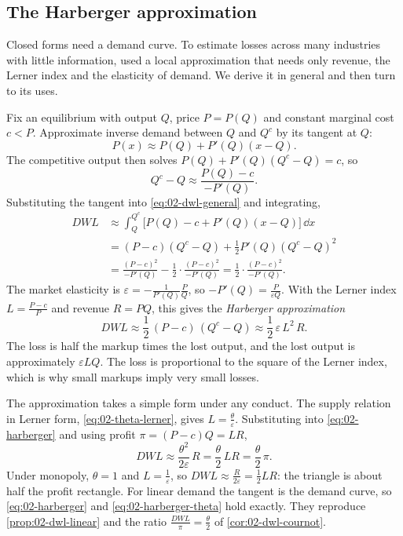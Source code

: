 \subsection{The Harberger approximation}\label{sec:02-harberger}

Closed forms need a demand curve. To estimate losses across many industries with little information,
\citet{Harberger1954} used a local approximation that needs only revenue, the Lerner index and the elasticity of
demand. We derive it in general and then turn to its uses.

Fix an equilibrium with output $Q$, price $P = P(Q)$ and constant marginal cost $c < P$. Approximate inverse demand
between $Q$ and $Q^c$ by its tangent at $Q$:
\begin{equation*}
P(x) \approx P(Q) + P'(Q)(x - Q).
\end{equation*}
The competitive output then solves $P(Q) + P'(Q)(Q^c - Q) = c$, so
\begin{equation*}
Q^c - Q \approx \frac{P(Q) - c}{-P'(Q)} .
\end{equation*}
Substituting the tangent into \eqref{eq:02-dwl-general} and integrating,
\begin{align*}
\mathit{DWL} &\approx \int_Q^{Q^c}\bigl[P(Q) - c + P'(Q)(x - Q)\bigr]\,\dd x \\
&= (P - c)(Q^c - Q) + \frac{1}{2}P'(Q)(Q^c - Q)^2 \\
&= \frac{(P - c)^2}{-P'(Q)} - \frac{1}{2}\cdot\frac{(P - c)^2}{-P'(Q)}
 = \frac{1}{2}\cdot\frac{(P - c)^2}{-P'(Q)} .
\end{align*}
The market elasticity is $\varepsilon = -\frac{1}{P'(Q)}\frac{P}{Q}$, so $-P'(Q) = \frac{P}{\varepsilon Q}$. With the
Lerner index $L = \frac{P - c}{P}$ and revenue $R = PQ$, this gives the \emph{Harberger approximation}
\begin{equation}\label{eq:02-harberger}
\mathit{DWL} \approx \frac{1}{2}\,(P - c)\,(Q^c - Q) \approx \frac{1}{2}\,\varepsilon\, L^2\, R .
\end{equation}
The loss is half the markup times the lost output, and the lost output is approximately $\varepsilon L Q$. The loss
is proportional to the square of the Lerner index, which is why small markups imply very small losses.

The approximation takes a simple form under any conduct. The supply relation in Lerner form,
\eqref{eq:02-theta-lerner}, gives $L = \frac{\theta}{\varepsilon}$. Substituting into \eqref{eq:02-harberger} and
using profit $\pi = (P - c)Q = LR$,
\begin{equation}\label{eq:02-harberger-theta}
\mathit{DWL} \approx \frac{\theta^2}{2\varepsilon}\,R = \frac{\theta}{2}\,L R = \frac{\theta}{2}\,\pi .
\end{equation}
Under monopoly, $\theta = 1$ and $L = \frac{1}{\varepsilon}$, so $\mathit{DWL} \approx \frac{R}{2\varepsilon} =
\frac{1}{2}LR$: the triangle is about half the profit rectangle. For linear demand the tangent is the demand curve,
so \eqref{eq:02-harberger} and \eqref{eq:02-harberger-theta} hold exactly. They reproduce
\cref{prop:02-dwl-linear} and the ratio $\frac{\mathit{DWL}}{\pi} = \frac{\theta}{2}$ of \cref{cor:02-dwl-cournot}.

